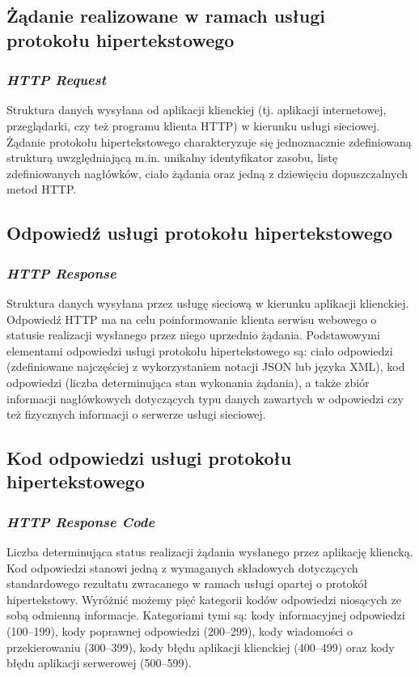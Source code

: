 \subsection*{Żądanie realizowane w ramach usługi protokołu hipertekstowego}
\subsubsection{\textit{HTTP Request}}
Struktura danych wysyłana od aplikacji klienckiej (tj. aplikacji internetowej, przeglądarki, czy też programu klienta HTTP) w kierunku usługi sieciowej. Żądanie protokołu hipertekstowego charakteryzuje się jednoznacznie zdefiniowaną strukturą uwzględniającą m.in. unikalny identyfikator zasobu, listę zdefiniowanych nagłówków, ciało żądania oraz jedną z dziewięciu dopuszczalnych metod HTTP. 

\subsection*{Odpowiedź usługi protokołu hipertekstowego}
\subsubsection{\textit{HTTP Response}}
Struktura danych wysyłana przez usługę sieciową w kierunku aplikacji klienckiej. Odpowiedź HTTP ma na celu poinformowanie klienta serwisu webowego o statusie realizacji wysłanego przez niego uprzednio żądania. Podstawowymi elementami odpowiedzi usługi protokołu hipertekstowego są: ciało odpowiedzi (zdefiniowane najczęściej z wykorzystaniem notacji JSON lub języka XML), kod odpowiedzi (liczba determinująca stan wykonania żądania), a także zbiór informacji nagłówkowych dotyczących typu danych zawartych w odpowiedzi czy też fizycznych informacji o serwerze usługi sieciowej.

\subsection*{Kod odpowiedzi usługi protokołu hipertekstowego}
\subsubsection{\textit{HTTP Response Code}}
Liczba determinująca status realizacji żądania wysłanego przez aplikację kliencką. Kod odpowiedzi stanowi jedną z wymaganych składowych dotyczących standardowego rezultatu zwracanego w ramach usługi opartej o protokół hipertekstowy. Wyróżnić możemy pięć kategorii kodów odpowiedzi niosących ze sobą odmienną informacje. Kategoriami tymi są: kody informacyjnej odpowiedzi (100--199), kody poprawnej odpowiedzi (200--299), kody wiadomości o przekierowaniu (300--399), kody błędu aplikacji klienckiej (400--499) oraz kody błędu aplikacji serwerowej (500--599).

